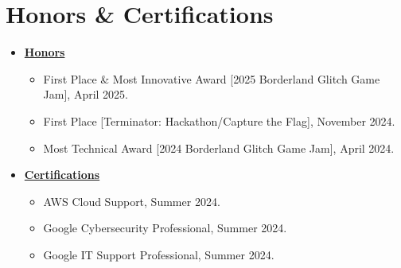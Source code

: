 \documentclass[letterpaper,11pt]{article} %
\begin{document}
\section{Honors \& Certifications} %
\begin{itemize}  %
  \item \textbf{\underline{Honors}} %
  \begin{itemize}  %
  \item First Place \& Most Innovative Award [2025 Borderland Glitch Game Jam], April 2025. %
  \item First Place [Terminator: Hackathon/Capture the Flag], November 2024. %
  \item Most Technical Award [2024 Borderland Glitch Game Jam], April 2024. %
  \end{itemize} %
\end{itemize} %

\begin{itemize}  %
  \item \textbf{\underline{Certifications}}   %
  \begin{itemize}  %
  \item AWS Cloud Support, Summer 2024. %
  \item Google Cybersecurity Professional, Summer 2024. %
  \item Google IT Support Professional, Summer 2024. %
  \end{itemize} %
\end{itemize} %
\end{document}
